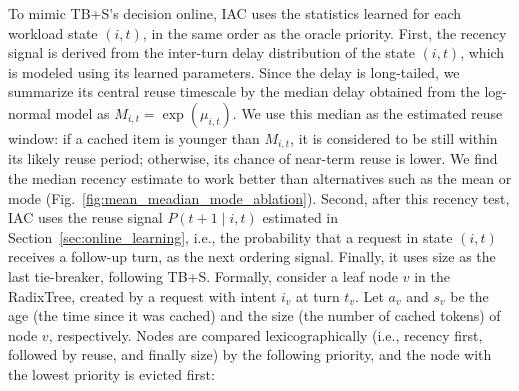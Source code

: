 \documentclass{article}
\newcommand{\bo}[1]{\textcolor{red}{[Bo: #1]}}
\begin{document}
To mimic TB+S's decision online, IAC uses the statistics learned for each workload state \((i,t)\), in the same order as the oracle priority.
First, the recency signal is derived from the inter-turn delay distribution of the state \((i,t)\), which is modeled using its learned parameters. Since the delay is long-tailed, we summarize its central reuse timescale by the median delay obtained from the log-normal model as \(M_{i,t}=\exp(\mu_{i,t})\).
We use this median as the estimated reuse window: if a cached item is younger than \(M_{i,t}\), it is considered to be still within its likely reuse period; otherwise, its chance of near-term reuse is lower. We find the median recency estimate to work better than alternatives such as the mean or mode (Fig.~\ref{fig:mean_meadian_mode_ablation}).
Second, after this recency test, IAC uses the reuse signal \(P(t+1 \mid i,t)\) estimated in Section~\ref{sec:online_learning}, i.e., the probability that a request in state \((i,t)\) receives a follow-up turn, as the next ordering signal. Finally, it uses size as the last tie-breaker, following TB+S.
Formally, consider a leaf node \(v\) in the RadixTree, created by a request with intent \(i_v\) at turn \(t_v\). Let \(a_v\) and \(s_v\) be the age (the time since it was cached) and the size (the number of cached tokens) of node \(v\), respectively. Nodes are compared lexicographically (i.e., recency first, followed by reuse, and finally size) by the following priority, and the node with the lowest priority is evicted first:
\end{document}
